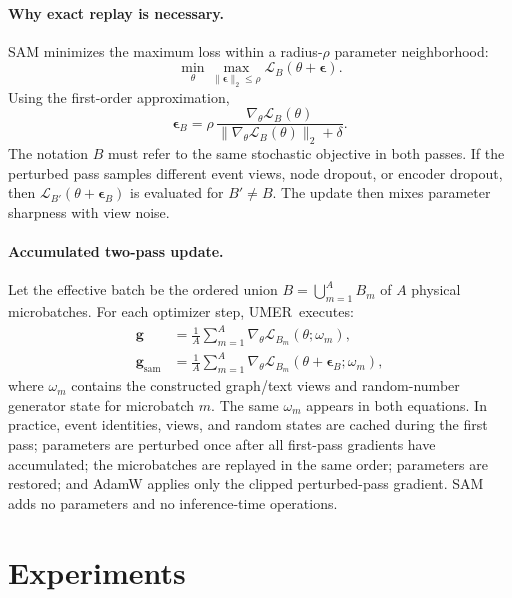 \documentclass[sigconf,anonymous,review]{../acmart/acmart}
\newcommand{\method}{\textsc{UMER}}
\begin{document}
\paragraph{Why exact replay is necessary.}
SAM minimizes the maximum loss within a radius-$\rho$ parameter neighborhood:
\begin{equation}
  \min_{\theta}
  \max_{\|\boldsymbol{\epsilon}\|_2\le\rho}
  \mathcal{L}_{B}(\theta+\boldsymbol{\epsilon}).
  \label{eq:sam-objective}
\end{equation}
Using the first-order approximation,
\begin{equation}
  \boldsymbol{\epsilon}_{B}
  =\rho\,
  \frac{\nabla_{\theta}\mathcal{L}_{B}(\theta)}
  {\|\nabla_{\theta}\mathcal{L}_{B}(\theta)\|_2+\delta}.
  \label{eq:sam-perturbation}
\end{equation}
The notation $B$ must refer to the same stochastic objective in both passes.
If the perturbed pass samples different event views, node dropout, or encoder
dropout, then
$\mathcal{L}_{B'}(\theta+\boldsymbol{\epsilon}_{B})$ is evaluated for
$B'\ne B$.  The update then mixes parameter sharpness with view noise.

\paragraph{Accumulated two-pass update.}
Let the effective batch be the ordered union
$B=\bigcup_{m=1}^{A}B_m$ of $A$ physical microbatches.  For each optimizer
step, \method\ executes:
\begin{align}
  \boldsymbol{g}
  &=\frac{1}{A}\sum_{m=1}^{A}
    \nabla_{\theta}\mathcal{L}_{B_m}(\theta;\omega_m),
  \label{eq:first-pass}\\
  \boldsymbol{g}_{\mathrm{sam}}
  &=\frac{1}{A}\sum_{m=1}^{A}
    \nabla_{\theta}
    \mathcal{L}_{B_m}(\theta+\boldsymbol{\epsilon}_{B};\omega_m),
  \label{eq:second-pass}
\end{align}
where $\omega_m$ contains the constructed graph/text views and random-number
generator state for microbatch $m$.  The same $\omega_m$ appears in both
equations.  In practice, event identities, views, and random states are cached
during the first pass; parameters are perturbed once after all first-pass
gradients have accumulated; the microbatches are replayed in the same order;
parameters are restored; and AdamW applies only the clipped perturbed-pass
gradient.  SAM adds no parameters and no inference-time operations.

\section{Experiments}
\label{sec:experiments}
\end{document}
